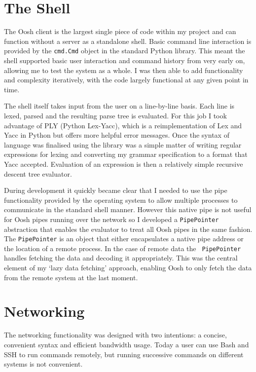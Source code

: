 \documentclass[12pt,twoside,notitlepage]{report}
\begin{document}
\section{The Shell}
The Oosh client is the largest single piece of code within my project
and can function without a server as a standalone shell. Basic command
line interaction is provided by the {\tt cmd.Cmd} object in the
standard Python library. This meant the shell supported basic user
interaction and command history from very early on, allowing me to
test the system as a whole. I was then able to add functionality and
complexity iteratively, with the code largely functional at any given
point in time.

The shell itself takes input from the user on a line-by-line
basis. Each line is lexed, parsed and the resulting parse tree is
evaluated. For this job I took advantage of PLY (Python Lex-Yacc),
which is a reimplementation of Lex and Yacc in Python but offers more
helpful error messages. Once the syntax of language was finalised
using the library was a simple matter of writing regular expressions
for lexing and converting my grammar specification to a format that
Yacc accepted. Evaluation of an expression is then a relatively simple
recursive descent tree evaluator.

During development it quickly became clear that I needed to use the
pipe functionality provided by the operating system to allow multiple
processes to communicate in the standard shell manner. However this
native pipe is not useful for Oosh pipes running over the network so I
developed a {\tt PipePointer} abstraction that enables the evaluator
to treat all Oosh pipes in the same fashion. The {\tt PipePointer} is
an object that either encapsulates a native pipe address or the
location of a remote process. In the case of remote data the {\tt
  PipePointer} handles fetching the data and decoding it
appropriately. This was the central element of my `lazy data fetching'
approach, enabling Oosh to only fetch the data from the remote system
at the last moment.

\section{Networking}
\label{networking}

The networking functionality was designed with two intentions: a concise,
convenient syntax and efficient bandwidth usage. Today a user can use Bash and
SSH to run commands remotely, but running successive commands on different
systems is not convenient.
\end{document}
